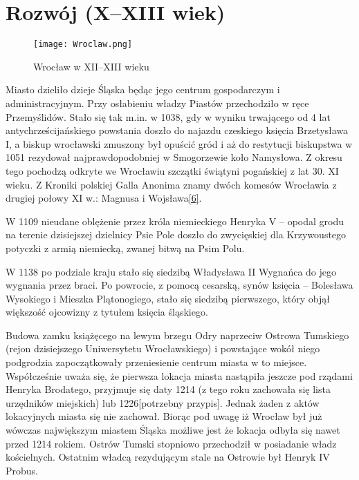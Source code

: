 \documentclass{article}
\begin{document}
\section{Rozwój (X–XIII wiek)}

\begin{wrapfigure}{r}{0.4\textwidth}
\begin{center}
\vspace{-20pt}
\texttt{[image: Wroclaw.png]}
\end{center}
\vspace{-20pt}
\caption{Wrocław w XII–XIII wieku}
\vspace{-10pt}
\end{wrapfigure}

Miasto dzieliło dzieje Śląska będąc jego centrum gospodarczym i administracyjnym. Przy osłabieniu władzy Piastów przechodziło w ręce Przemyślidów. Stało się tak m.in. w 1038, gdy w wyniku trwającego od 4 lat antychrześcijańskiego powstania doszło do najazdu czeskiego księcia Brzetysława I, a biskup wrocławski zmuszony był opuścić gród i aż do restytucji biskupstwa w 1051 rezydował najprawdopodobniej w Smogorzewie koło Namysłowa. Z okresu tego pochodzą odkryte we Wrocławiu szczątki świątyni pogańskiej z lat 30. XI wieku. Z Kroniki polskiej Galla Anonima znamy dwóch komesów Wrocławia z drugiej połowy XI w.: Magnusa i Wojsława\hyperref[6]{[6]}.


W 1109 nieudane oblężenie przez króla niemieckiego Henryka V – opodal grodu na terenie dzisiejszej dzielnicy Psie Pole doszło do zwycięskiej dla Krzywoustego potyczki z armią niemiecką, zwanej bitwą na Psim Polu.

W 1138 po podziale kraju stało się siedzibą Władysława II Wygnańca do jego wygnania przez braci. Po powrocie, z pomocą cesarską, synów księcia – Bolesława Wysokiego i Mieszka Plątonogiego, stało się siedzibą pierwszego, który objął większość ojcowizny z tytułem księcia śląskiego.

Budowa zamku książęcego na lewym brzegu Odry naprzeciw Ostrowa Tumskiego (rejon dzisiejszego Uniwersytetu Wrocławskiego) i powstające wokół niego podgrodzia zapoczątkowały przeniesienie centrum miasta w to miejsce. Współcześnie uważa się, że pierwsza lokacja miasta nastąpiła jeszcze pod rządami Henryka Brodatego, przyjmuje się daty 1214 (z tego roku zachowała się lista urzędników miejskich) lub 1226[potrzebny przypis]. Jednak żaden z aktów lokacyjnych miasta się nie zachował. Biorąc pod uwagę iż Wrocław był już wówczas największym miastem Śląska możliwe jest że lokacja odbyła się nawet przed 1214 rokiem. Ostrów Tumski stopniowo przechodził w posiadanie władz kościelnych. Ostatnim władcą rezydującym stale na Ostrowie był Henryk IV Probus.
\end{document}
